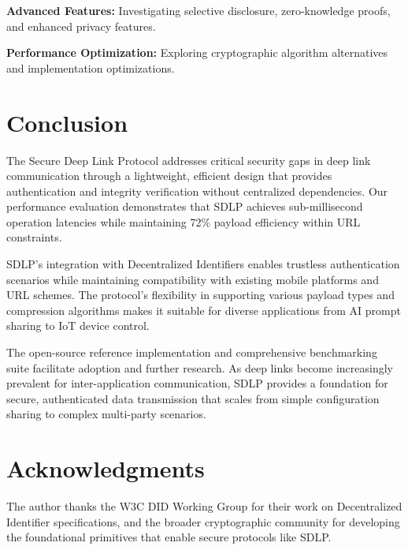 \documentclass[conference]{IEEEtran}
\begin{document}
\textbf{Advanced Features:} Investigating selective disclosure, zero-knowledge proofs, and enhanced privacy features.

\textbf{Performance Optimization:} Exploring cryptographic algorithm alternatives and implementation optimizations.

\section{Conclusion}

The Secure Deep Link Protocol addresses critical security gaps in deep link communication through a lightweight, efficient design that provides authentication and integrity verification without centralized dependencies. Our performance evaluation demonstrates that SDLP achieves sub-millisecond operation latencies while maintaining 72\% payload efficiency within URL constraints.

SDLP's integration with Decentralized Identifiers enables trustless authentication scenarios while maintaining compatibility with existing mobile platforms and URL schemes. The protocol's flexibility in supporting various payload types and compression algorithms makes it suitable for diverse applications from AI prompt sharing to IoT device control.

The open-source reference implementation and comprehensive benchmarking suite facilitate adoption and further research. As deep links become increasingly prevalent for inter-application communication, SDLP provides a foundation for secure, authenticated data transmission that scales from simple configuration sharing to complex multi-party scenarios.

\section*{Acknowledgments}

The author thanks the W3C DID Working Group for their work on Decentralized Identifier specifications, and the broader cryptographic community for developing the foundational primitives that enable secure protocols like SDLP.



\end{document}
